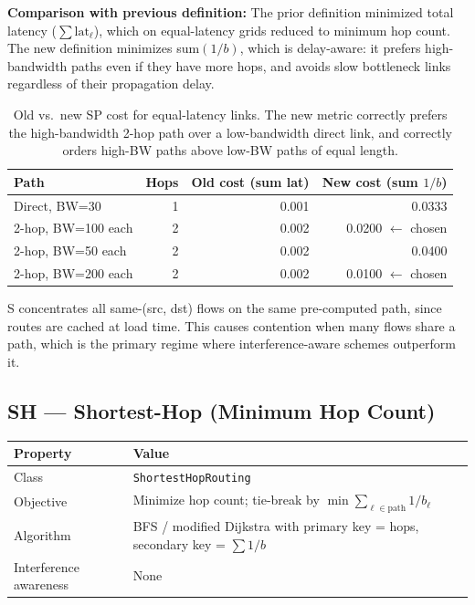 \documentclass[11pt]{article}
\begin{document}
\medskip
\textbf{Comparison with previous definition:}  The prior definition minimized
total latency ($\sum \text{lat}_\ell$), which on equal-latency grids reduced
to minimum hop count.  The new definition minimizes sum$(1/b)$, which is
delay-aware: it prefers high-bandwidth paths even if they have more hops, and
avoids slow bottleneck links regardless of their propagation delay.

\begin{table}[h]
\centering
\small
\begin{tabular}{lrrr}
\toprule
\textbf{Path} & \textbf{Hops} & \textbf{Old cost (sum lat)} & \textbf{New cost (sum $1/b$)} \\
\midrule
Direct, BW=30 & 1 & 0.001 & 0.0333 \\
2-hop, BW=100 each & 2 & 0.002 & 0.0200 $\leftarrow$ chosen \\
2-hop, BW=50 each  & 2 & 0.002 & 0.0400 \\
2-hop, BW=200 each & 2 & 0.002 & 0.0100 $\leftarrow$ chosen \\
\bottomrule
\end{tabular}
\caption{Old vs.\ new SP cost for equal-latency links.  The new metric
correctly prefers the high-bandwidth 2-hop path over a low-bandwidth direct
link, and correctly orders high-BW paths above low-BW paths of equal length.}
\end{table}

\medskip
S concentrates all same-(src, dst) flows on the same pre-computed path,
since routes are cached at load time.  This causes contention when many
flows share a path, which is the primary regime where interference-aware
schemes outperform it.

\subsection{SH --- Shortest-Hop (Minimum Hop Count)}

\begin{tabular}{@{}ll@{}}
\toprule
\textbf{Property} & \textbf{Value} \\
\midrule
Class        & \texttt{ShortestHopRouting} \\
Objective    & Minimize hop count; tie-break by $\min \sum_{\ell \in \text{path}} 1/b_\ell$ \\
Algorithm    & BFS / modified Dijkstra with primary key = hops, secondary key = $\sum 1/b$ \\
Interference awareness & None \\
\bottomrule
\end{tabular}
\end{document}
